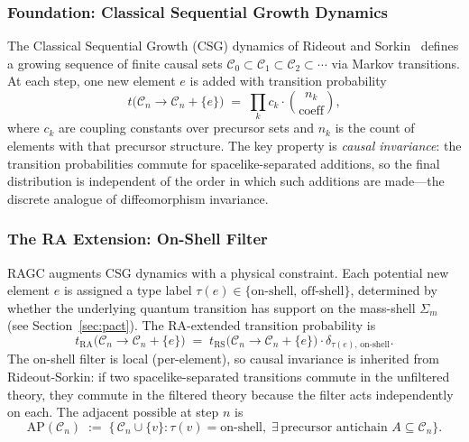 \documentclass[11pt,a4paper]{article}
\theoremstyle{plain}
\theoremstyle{definition}
\theoremstyle{remark}
\newcommand{\Sigmam}{\Sigma_{m}}
\newcommand{\AP}{\mathrm{AP}}
\begin{document}
\subsubsection{Foundation: Classical Sequential Growth Dynamics}

The Classical Sequential Growth (CSG) dynamics of Rideout and
Sorkin~\citep{RideoutSorkin2000} defines a growing sequence of finite causal sets
$\mathcal{C}_{0} \subset \mathcal{C}_{1} \subset \mathcal{C}_{2} \subset \cdots$
via Markov transitions. At each step, one new element $e$ is added with transition
probability
\begin{equation}
  t\bigl(\mathcal{C}_{n} \to \mathcal{C}_{n} + \{e\}\bigr)
  \;=\;
  \prod_{k} c_{k} \cdot \binom{n_{k}}{\text{coeff}},
  \label{eq:amplitude}
\end{equation}
where $c_{k}$ are coupling constants over precursor sets and $n_{k}$ is the count
of elements with that precursor structure. The key property is \emph{causal
invariance}: the transition probabilities commute for spacelike-separated
additions, so the final distribution is independent of the order in which such
additions are made---the discrete analogue of diffeomorphism invariance.

\subsubsection{The RA Extension: On-Shell Filter}

RAGC augments CSG dynamics with a physical constraint. Each potential new element
$e$ is assigned a type label $\tau(e) \in \{\text{on-shell},\,\text{off-shell}\}$,
determined by whether the underlying quantum transition has support on the
mass-shell $\Sigmam$ (see Section~\ref{sec:pact}). The RA-extended transition
probability is
\begin{equation}
  t_{\mathrm{RA}}\bigl(\mathcal{C}_{n} \to \mathcal{C}_{n} + \{e\}\bigr)
  \;=\;
  t_{\mathrm{RS}}\bigl(\mathcal{C}_{n} \to \mathcal{C}_{n} + \{e\}\bigr)
  \cdot \delta_{\tau(e),\,\text{on-shell}}.
\end{equation}
The on-shell filter is local (per-element), so causal invariance is inherited from
Rideout-Sorkin: if two spacelike-separated transitions commute in the unfiltered
theory, they commute in the filtered theory because the filter acts independently
on each. The adjacent possible at step $n$ is
\begin{equation}
  \AP(\mathcal{C}_{n})
  \;:=\;
  \bigl\{\, \mathcal{C}_{n} \cup \{v\} :
    \tau(v) = \text{on-shell},\;
    \exists\,\text{precursor antichain } A \subseteq \mathcal{C}_{n}
  \bigr\}.
\end{equation}
\end{document}
